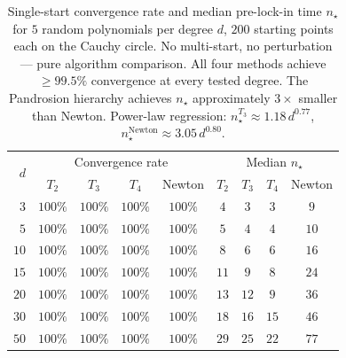 \documentclass[10pt,a4paper,oneside]{book}
\theoremstyle{definition}
\theoremstyle{remark}
\begin{document}
\begin{table}[H]
\centering
\renewcommand{\arraystretch}{1.2}
\begin{tabular}{r|cccc|cccc}
\toprule
\multirow{2}{*}{$d$} & \multicolumn{4}{c|}{Convergence rate} & \multicolumn{4}{c}{Median $n_\star$} \\
& $T_2$ & $T_3$ & $T_4$ & Newton & $T_2$ & $T_3$ & $T_4$ & Newton \\
\midrule
$3$ & $100\%$ & $100\%$ & $100\%$ & $100\%$ & $4$ & $3$ & $3$ & $9$ \\
$5$ & $100\%$ & $100\%$ & $100\%$ & $100\%$ & $5$ & $4$ & $4$ & $10$ \\
$10$ & $100\%$ & $100\%$ & $100\%$ & $100\%$ & $8$ & $6$ & $6$ & $16$ \\
$15$ & $100\%$ & $100\%$ & $100\%$ & $100\%$ & $11$ & $9$ & $8$ & $24$ \\
$20$ & $100\%$ & $100\%$ & $100\%$ & $100\%$ & $13$ & $12$ & $9$ & $36$ \\
$30$ & $100\%$ & $100\%$ & $100\%$ & $100\%$ & $18$ & $16$ & $15$ & $46$ \\
$50$ & $100\%$ & $100\%$ & $100\%$ & $100\%$ & $29$ & $25$ & $22$ & $77$ \\
\bottomrule
\end{tabular}
\caption{Single-start convergence rate and median pre-lock-in time $n_\star$ for $5$ random polynomials per degree $d$, $200$ starting points each on the Cauchy circle.  No multi-start, no perturbation --- pure algorithm comparison.  All four methods achieve $\geq 99.5\%$ convergence at every tested degree.  The Pandrosion hierarchy achieves $n_\star$ approximately $3\times$ smaller than Newton.  Power-law regression: $n_\star^{T_3} \approx 1.18\, d^{0.77}$, $n_\star^{\mathrm{Newton}} \approx 3.05\, d^{0.80}$.}
\label{tab:scaling_higher_order}
\end{table}
\end{document}
